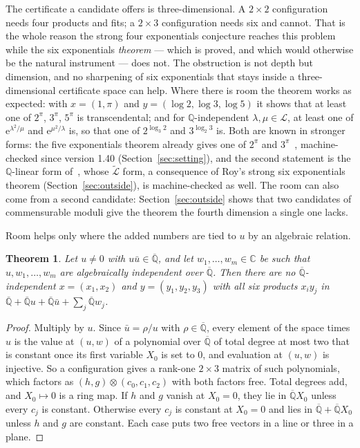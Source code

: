 \documentclass[11pt,a4paper]{article}
\theoremstyle{plain}
\newtheorem{theorem}{Theorem}[section]
\theoremstyle{definition}
\newcommand{\C}{\mathbb{C}}
\newcommand{\e}{\mathrm{e}}
\newcommand{\Q}{\mathbb{Q}}
\newcommand{\Alg}{\overline{\mathbb{Q}}}
\newcommand{\Logs}{\mathcal{L}}
\newcommand{\aLogs}{\widetilde{\mathcal{L}}}
\begin{document}
The certificate a candidate offers is three-dimensional. A $2\times2$ configuration needs four
products and fits; a $2\times3$ configuration needs six and cannot. That is the whole reason the
strong four exponentials conjecture reaches this problem while the six exponentials
\emph{theorem} --- which is proved, and which would otherwise be the natural instrument --- does
not. The obstruction is not depth but dimension, and no sharpening of six exponentials that
stays inside a three-dimensional certificate space can help. Where there is room the theorem
works as expected: with $x=(1,\pi)$ and $y=(\log2,\log3,\log5)$ it shows that at least one of
$2^{\pi}$, $3^{\pi}$, $5^{\pi}$ is transcendental; and for $\Q$-independent
$\lambda,\mu\in\Logs$, at least one of $\e^{\lambda^{2}/\mu}$ and $\e^{\mu^{2}/\lambda}$ is, so that
one of $2^{\log_{3}2}$ and $3^{\log_{2}3}$ is. Both are known in stronger forms: the five
exponentials theorem already gives one of $2^{\pi}$ and $3^{\pi}$~\cite[(2.2.3)]{waldschmidt-1988},
machine-checked since version 1.40 (Section~\ref{sec:setting}), and the second statement is the $\Q$-linear form of~\cite[Corollaire~4(3)]{diaz-2007}, whose
$\aLogs$ form, a consequence of Roy's strong six exponentials theorem (Section~\ref{sec:outside}), is
machine-checked as well. The room can
also come from a second candidate:
Section~\ref{sec:outside} shows that two candidates of commensurable moduli give the theorem the
fourth dimension a single one lacks.

Room helps only where the added numbers are tied to $u$ by an algebraic relation.

\begin{theorem}\label{thm:generic-room}
Let $u\neq0$ with $u\bar u\in\Alg$, and let $w_{1},\dots,w_{m}\in\C$ be such that
$u,w_{1},\dots,w_{m}$ are algebraically independent over $\Alg$. Then there are no $\Alg$-independent
$x=(x_{1},x_{2})$ and $y=(y_{1},y_{2},y_{3})$ with all six products $x_{i}y_{j}$ in
$\Alg+\Alg u+\Alg\bar u+\sum_{j}\Alg w_{j}$.
\end{theorem}

\begin{proof}
Multiply by $u$. Since $\bar u=\rho/u$ with $\rho\in\Alg$, every element of the space times $u$ is the
value at $(u,w)$ of a polynomial over $\Alg$ of total degree at most two that is constant once its
first variable $X_{0}$ is set to $0$, and evaluation at $(u,w)$ is injective. So a configuration gives
a rank-one $2\times3$ matrix of such polynomials, which factors as $(h,g)\otimes(c_{0},c_{1},c_{2})$
with both factors free. Total degrees add, and $X_{0}\mapsto0$ is a ring map. If $h$ and $g$ vanish
at $X_{0}=0$, they lie in $\Alg X_{0}$ unless every $c_{j}$ is constant. Otherwise every $c_{j}$ is
constant at $X_{0}=0$ and lies in $\Alg+\Alg X_{0}$ unless $h$ and $g$ are constant. Each case puts
two free vectors in a line or three in a plane.
\end{proof}
\end{document}
